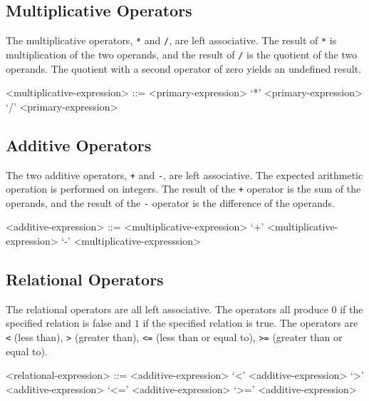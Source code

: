 \subsection{Multiplicative Operators}
The multiplicative operators, \texttt{*} and \texttt{/}, are left associative.  The result of \texttt{*} is multiplication of the two operands, and the result of \texttt{/} is the quotient of the two operands.  The quotient with a second operator of zero yields an undefined result.
\begin{grammar}
<multiplicative-expression> ::= <primary-expression>
 `*' <primary-expression>
 `/' <primary-expression>
\end{grammar}

\subsection{Additive Operators}
The two additive operators, \texttt{+} and \texttt{-}, are left associative.  The expected arithmetic operation is performed on integers.  The result of the \texttt{+} operator is the sum of the operands, and the result of the \texttt{-} operator is the difference of the operands.
\begin{grammar}
<additive-expression> ::= <multiplicative-expression>
 `+' <multiplicative-expression>
 `-' <multiplicative-expresssion>
\end{grammar}


\subsection{Relational Operators}
The relational operators are all left associative.  The operators all produce $0$ if the specified relation is false and $1$ if the specified relation is true.  The operators are \texttt{<} (less than), \texttt{>} (greater than), \texttt{<=} (less than or equal to), \texttt{>=} (greater than or equal to).
\begin{grammar}
<relational-expression> ::= <additive-expression>
 `<' <additive-expression>
 `>' <additive-expression>
 `<=' <additive-expression>
 `>=' <additive-expression>
\end{grammar}

